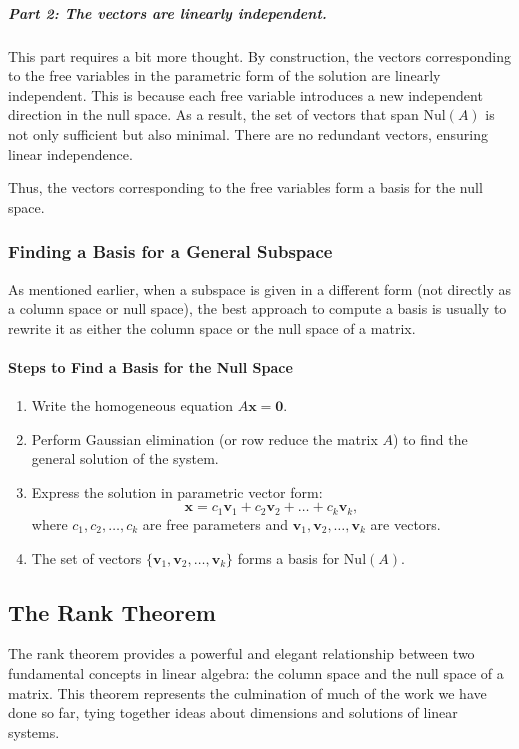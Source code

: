\documentclass[a4paper,12pt]{article}
\begin{document}
\subparagraph{Part 2: The vectors are linearly independent.}
This part requires a bit more thought. By construction, the vectors corresponding to the free variables in the parametric form of the solution are linearly independent. This is because each free variable introduces a new independent direction in the null space. As a result, the set of vectors that span \(\text{Nul}(A)\) is not only sufficient but also minimal. There are no redundant vectors, ensuring linear independence.

Thus, the vectors corresponding to the free variables form a basis for the null space.

\subsubsection{Finding a Basis for a General Subspace}
As mentioned earlier, when a subspace is given in a different form (not directly as a column space or null space), the best approach to compute a basis is usually to rewrite it as either the column space or the null space of a matrix.

\paragraph{Steps to Find a Basis for the Null Space}
\begin{enumerate}
    \item Write the homogeneous equation \(A \mathbf{x} = \mathbf{0}\).
    \item Perform Gaussian elimination (or row reduce the matrix \(A\)) to find the general solution of the system.
    \item Express the solution in parametric vector form:\[\mathbf{x} = c_1 \mathbf{v}_1 + c_2 \mathbf{v}_2 + \dots + c_k \mathbf{v}_k,\]where \(c_1, c_2, \dots, c_k\) are free parameters and \(\mathbf{v}_1, \mathbf{v}_2, \dots, \mathbf{v}_k\) are vectors.
    \item The set of vectors \(\{\mathbf{v}_1, \mathbf{v}_2, \dots, \mathbf{v}_k\}\) forms a basis for \(\text{Nul}(A)\).
\end{enumerate}

\subsection{The Rank Theorem}

The rank theorem provides a powerful and elegant relationship between two fundamental concepts in linear algebra: the column space and the null space of a matrix. This theorem represents the culmination of much of the work we have done so far, tying together ideas about dimensions and solutions of linear systems.
\end{document}
